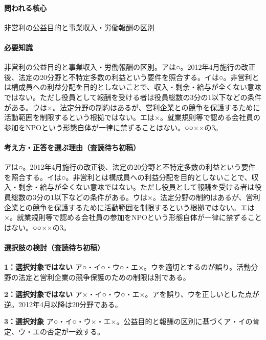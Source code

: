 \paragraph{問われる核心} 非営利の公益目的と事業収入・労働報酬の区別

\paragraph{必要知識} 非営利の公益目的と事業収入・労働報酬の区別。アは○。2012年4月施行の改正後、法定の20分野と不特定多数の利益という要件を照合する。イは○。非営利とは構成員への利益分配を目的としないことで、収入・剰余・給与が全くない意味ではない。ただし役員として報酬を受ける者は役員総数の3分の1以下などの条件がある。ウは×。法定分野の制約はあるが、営利企業との競争を保護するために活動範囲を制限するという根拠ではない。エは×。就業規則等で認める会社員の参加をNPOという形態自体が一律に禁ずることはない。○○××の3。

\paragraph{考え方・正答を選ぶ理由（査読待ち初稿）} アは○。2012年4月施行の改正後、法定の20分野と不特定多数の利益という要件を照合する。イは○。非営利とは構成員への利益分配を目的としないことで、収入・剰余・給与が全くない意味ではない。ただし役員として報酬を受ける者は役員総数の3分の1以下などの条件がある。ウは×。法定分野の制約はあるが、営利企業との競争を保護するために活動範囲を制限するという根拠ではない。エは×。就業規則等で認める会社員の参加をNPOという形態自体が一律に禁ずることはない。○○××の3。

\paragraph{選択肢の検討（査読待ち初稿）}\mbox{}\par

\noindent\textbf{1：選択対象ではない} ア○・イ○・ウ○・エ×。ウを適切とするのが誤り。活動分野の法定と営利企業の競争保護のための制限は別である。\par

\noindent\textbf{2：選択対象ではない} ア×・イ○・ウ○・エ×。アを誤り、ウを正しいとした点が逆。2012年4月以降は20分野である。\par

\noindent\textbf{3：選択対象} ア○・イ○・ウ×・エ×。公益目的と報酬の区別に基づくア・イの肯定、ウ・エの否定が一致する。\par

